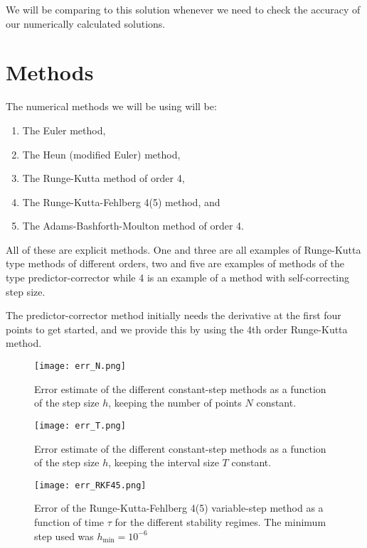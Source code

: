 \documentclass[10pt,a4paper,twocolumn]{article}
\begin{document}
We will be comparing to this solution whenever we need to check the accuracy of our numerically calculated solutions.


\section{Methods}

The numerical methods we will be using will be:
%
\begin{enumerate}
    \item The Euler method,
    \item The Heun (modified Euler) method,
    \item The Runge-Kutta method of order 4,
    \item The Runge-Kutta-Fehlberg 4(5) method, and
    \item The Adams-Bashforth-Moulton method of order 4.
\end{enumerate}

All of these are explicit methods. One and three are all examples of Runge-Kutta type methods of different orders, two and five are examples of methods of the type predictor-corrector while 4 is an example of a method with self-correcting step size.

The predictor-corrector method initially needs the derivative at the first four points to get started, and we provide this by using the 4th order Runge-Kutta method.


\begin{figure}
    \centering
    \captionsetup{justification=centering}
    \texttt{[image: err\_N.png]}
    \caption{Error estimate of the different constant-step methods as a function of the step size $h$, keeping the number of points $N$ constant.}
    \label{fig:err_N}
\end{figure}

\begin{figure}
    \centering
    \captionsetup{justification=centering}
    \texttt{[image: err\_T.png]}
    \caption{Error estimate of the different constant-step methods as a function of the step size $h$, keeping the interval size $T$ constant.}
    \label{fig:err_T}
\end{figure}

\begin{figure}
    \centering
    \captionsetup{justification=centering}
    \texttt{[image: err\_RKF45.png]}
    \caption{Error of the Runge-Kutta-Fehlberg 4(5) variable-step method as a function of time $\tau$ for the different stability regimes. The minimum step used was $h_{\mathrm{min}} = 10^{-6}$}
    \label{fig:err_RKF45}
\end{figure}
\end{document}

